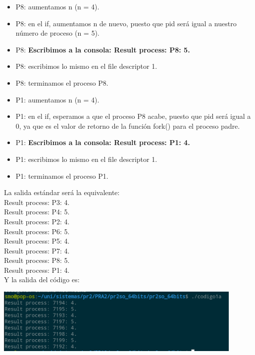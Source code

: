 \documentclass[spanish]{article}
\begin{document}
\begin{itemize}
\item P8: aumentamos n (n = 4).
\item P8: en el if, aumentamos n de nuevo, puesto que pid
será igual a nuestro número de proceso (n = 5).
\item P8: \textbf{Escribimos a la consola: Result process:
P8: 5.}
\item P8: escribimos lo mismo en el file descriptor 1.
\item P8: terminamos el proceso P8.

\item P1: aumentamos n (n = 4).
\item P1: en el if, esperamos a que el proceso P8 acabe,
puesto que pid será igual a 0, ya que es el valor de retorno
de la función fork() para el proceso padre.
\item P1: \textbf{Escribimos a la consola: Result process:
P1: 4.}
\item P1: escribimos lo mismo en el file descriptor 1.
\item P1: terminamos el proceso P1.

\end{itemize}

\newpage

La salida estándar será la equivalente:\\

Result process: P3: 4.\\

Result process: P4: 5.\\

Result process: P2: 4.\\

Result process: P6: 5.\\

Result process: P5: 4.\\

Result process: P7: 4.\\

Result process: P8: 5.\\

Result process: P1: 4.\\

Y la salida del código es:

\begin{center}
\includegraphics[width=12cm]{../img/1.png}
\end{center}
\end{document}
